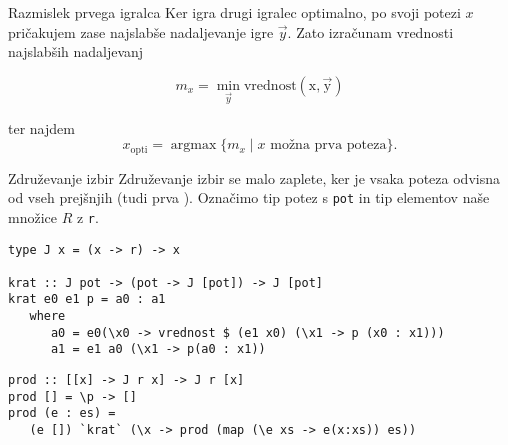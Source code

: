 \documentclass{beamer}
\newcommand{\argmax}{\operatorname{argmax}}
\begin{document}
\begin{frame}{Razmislek prvega igralca}
Ker igra drugi igralec optimalno, po svoji potezi $x$ pričakujem zase najslabše nadaljevanje igre $\vec{y}$. Zato izračunam vrednosti najslabših nadaljevanj

$$m_x =\min_{\vec{y}} \operatorname{vrednost(x,\vec{y})}$$

ter najdem $$x_{\text{opti}} = \argmax \{m_x\mid x \text{ možna prva poteza} \}\text{.}$$



\end{frame}

\begin{frame}[fragile]{Združevanje izbir}%
Združevanje izbir se malo zaplete, ker je vsaka poteza odvisna od vseh prejšnjih (tudi prva \smiley).
Označimo tip potez s \texttt{pot} in tip elementov naše množice $R$ z \texttt{r}.
\pause
\begin{lstlisting}
type J x = (x -> r) -> x

krat :: J pot -> (pot -> J [pot]) -> J [pot]
krat e0 e1 p = a0 : a1
   where
      a0 = e0(\x0 -> vrednost $ (e1 x0) (\x1 -> p (x0 : x1)))
      a1 = e1 a0 (\x1 -> p(a0 : x1))
\end{lstlisting}
\pause
\begin{lstlisting}
prod :: [[x] -> J r x] -> J r [x]
prod [] = \p -> []
prod (e : es) =  
   (e []) `krat` (\x -> prod (map (\e xs -> e(x:xs)) es))
\end{lstlisting}
\end{frame}
\end{document}
